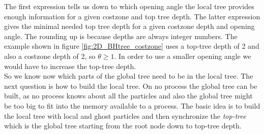 The first expression tells us down to which opening angle the local tree provides enough information for a given costzone and top tree depth. The latter expression gives the minimal needed top tree depth for a given costzone depth and opening angle. The rounding up is because depths are always integer numbers. The example shown in  figure \ref{fig:2D_BHtree_costzone} uses a top-tree depth of 2 and also a costzone depth of 2, so $\theta \ge 1$. In order to use a smaller opening angle we would have to increase the top-tree depth.\\

So we know now which parts of the global tree need to be in the local tree. The next question is how to build the local tree. On no process the global tree can be built, as no process knows about all the particles and also the global tree might be too big to fit into the memory available to a process. The basic idea is to build the local tree with local and ghost particles and then synchronize the \emph{top-tree} which is the global tree starting from the root node down to top-tree depth.
